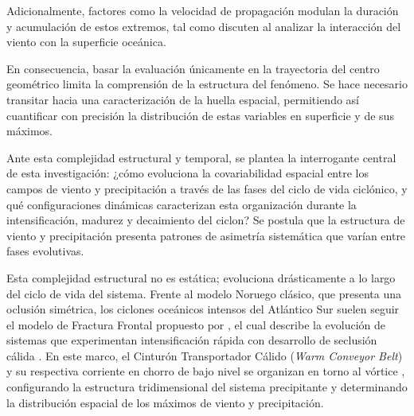 Adicionalmente, factores como la velocidad de propagación modulan la duración y acumulación de estos extremos, tal como discuten \citet{gramcianinov2023impact} al analizar la interacción del viento con la superficie oceánica.

En consecuencia, basar la evaluación únicamente en la trayectoria del centro geométrico limita la comprensión de la estructura del fenómeno. Se hace necesario transitar hacia una caracterización de la huella espacial, permitiendo así cuantificar con precisión la distribución de estas variables en superficie y de sus máximos. %

Ante esta complejidad estructural y temporal, se plantea la interrogante central de esta investigación: ¿cómo evoluciona la covariabilidad espacial entre los campos de viento y precipitación a través de las fases del ciclo de vida ciclónico, y qué configuraciones dinámicas caracterizan esta organización durante la intensificación, madurez y decaimiento del ciclon? 
Se postula que la estructura de viento y precipitación presenta patrones de asimetría sistemática que varían entre fases evolutivas.

Esta complejidad estructural no es estática; evoluciona drásticamente a lo largo del ciclo de vida del sistema. Frente al modelo Noruego clásico, que presenta una oclusión simétrica, los ciclones oceánicos intensos del Atlántico Sur suelen seguir el modelo de Fractura Frontal propuesto por \citet{shapiro1990life}, el cual describe la evolución de sistemas que experimentan intensificación rápida con desarrollo de seclusión cálida \citep{shapiro1999bridge}. En este marco, el Cinturón Transportador Cálido (\textit{Warm Conveyor Belt}) y su respectiva corriente en chorro de bajo nivel se organizan en torno al vórtice \citep{browning1986conceptual}, configurando la estructura tridimensional del sistema precipitante y determinando la distribución espacial de los máximos de viento y precipitación.

